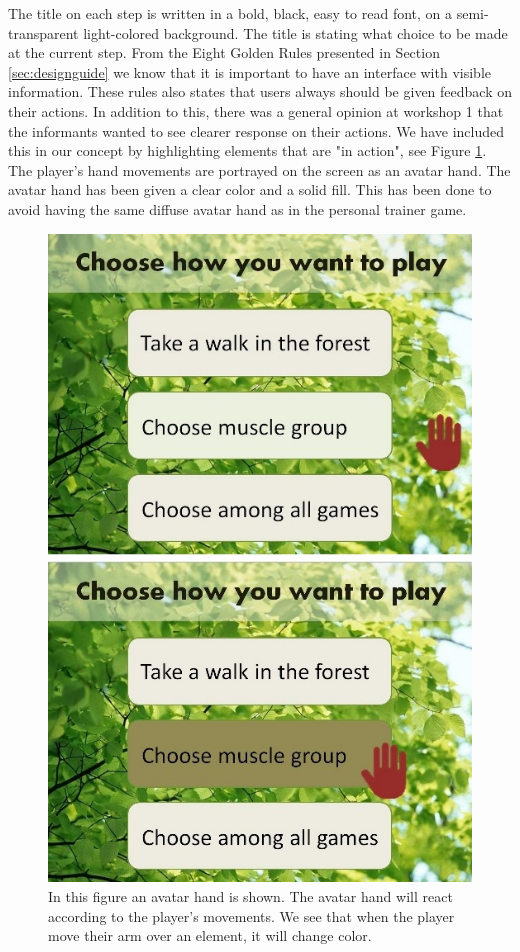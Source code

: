 The title on each step is written in a bold, black, easy to read font, on a semi-transparent light-colored background. The title is stating what choice to be made at the current step. From the Eight Golden Rules presented in Section \ref{sec:designguide} we know that it is important to have an interface with visible information. These rules also states that users always should be given feedback on their actions. In addition to this, there was a general opinion at workshop 1 that the informants wanted to see clearer response on their actions. We have included this in our concept by highlighting elements that are "in action", see Figure \ref{fig:avatarAction}. The player's hand movements are portrayed on the screen as an avatar hand. The avatar hand has been given a clear color and a solid fill. This has been done to avoid having the same diffuse avatar hand as in the personal trainer game.  

\begin{figure} [H]
\centering
\includegraphics[scale=0.5]{menuAction.jpg}
\caption[Menu - Action and response]{In this figure an avatar hand is shown. The avatar hand will react according to the player's movements. We see that when the player move their arm over an element, it will change color.}
\label{fig:avatarAction}
\end{figure} 


